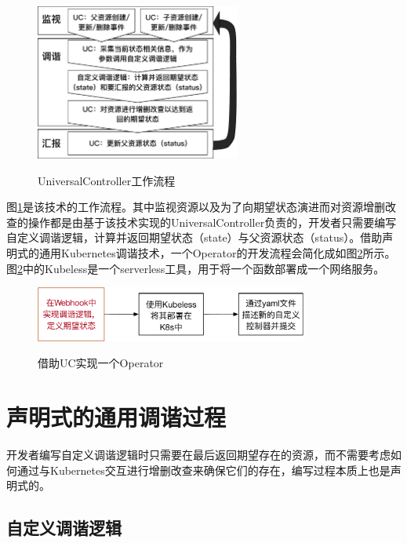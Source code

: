 \documentclass[macfonts,master]{njuthesis}
\begin{document}
\begin{figure}[htbp]
  \centering
  \includegraphics[width=0.6\textwidth]{pics/UniversalController-Workflow.pdf}\\
  \caption{UniversalController工作流程}\label{fig:UniversalController-Workflow}
\end{figure}

图\ref{fig:UniversalController-Workflow}是该技术的工作流程。其中监视资源以及为了向期望状态演进而对资源增删改查的操作都是由基于该技术实现的UniversalController负责的，开发者只需要编写自定义调谐逻辑，计算并返回期望状态（state）与父资源状态（status）。借助声明式的通用Kubernetes调谐技术，一个Operator的开发流程会简化成如图\ref{fig:uc-coding-operator}所示。图\ref{fig:uc-coding-operator}中的Kubeless是一个serverless工具，用于将一个函数部署成一个网络服务。


\begin{figure}[htbp]
  \centering
  \includegraphics[width=0.8\textwidth]{pics/uc-coding-operator.pdf}\\
  \caption{借助UC实现一个Operator}\label{fig:uc-coding-operator}
\end{figure}

\section{声明式的通用调谐过程}\label{section:dur}
开发者编写自定义调谐逻辑时只需要在最后返回期望存在的资源，而不需要考虑如何通过与Kubernetes交互进行增删改查来确保它们的存在，编写过程本质上也是声明式的。

\subsection{自定义调谐逻辑}
\end{document}
